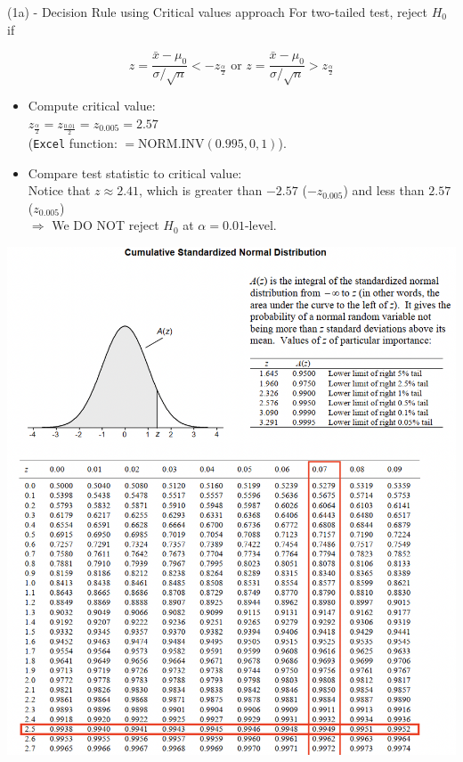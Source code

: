 \documentclass[
  11pt,
  ignorenonframetext,
]{beamer}
\providecommand{\tightlist}{%
  \setlength{\itemsep}{0pt}\setlength{\parskip}{0pt}}
\begin{document}
\begin{frame}[fragile]{(1a) - Decision Rule using Critical values
approach}
\protect\hypertarget{a---decision-rule-using-critical-values-approach}{}
For two-tailed test, reject \(H_0\) if

\[
z = \frac{\bar{x}-\mu_0}{\sigma/\sqrt{n}} < -z_{\frac{\alpha}{2}} \text{ or } z = \frac{\bar{x}-\mu_0}{\sigma/\sqrt{n}} > z_{\frac{\alpha}{2}}
\]

\vspace{2mm}

\begin{itemize}
\tightlist
\item
  Compute critical value:\\
  \(z_{\frac{\alpha}{2}} = z_{\frac{0.01}{2}} = z_{0.005} = 2.57\)\\
  (\texttt{Excel} function: \(=\text{NORM.INV}(0.995,0,1)\)).
\end{itemize}

\vspace{2mm}

\begin{itemize}
\tightlist
\item
  Compare test statistic to critical value:\\
  Notice that \(z \approx 2.41\), which is greater than \(-2.57\)
  (\(-z_{0.005}\)) and less than \(2.57\) (\(z_{0.005}\))\\
  \(\Rightarrow\) We DO NOT reject \(H_0\) at \(\alpha = 0.01\)-level.
\end{itemize}
\end{frame}

\begin{frame}{}
\protect\hypertarget{section}{}
\begin{center}\includegraphics[width=0.7\linewidth]{pictures/Zvalue} \end{center}
\end{frame}
\end{document}
